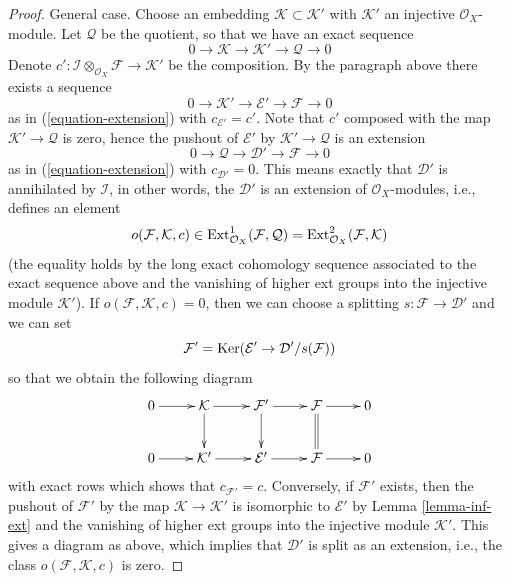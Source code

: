 \begin{proof}
\medskip\noindent
General case. Choose an embedding $\mathcal{K} \subset \mathcal{K}'$
with $\mathcal{K}'$ an injective $\mathcal{O}_X$-module. Let $\mathcal{Q}$
be the quotient, so that we have an exact sequence
$$
0 \to \mathcal{K} \to \mathcal{K}' \to \mathcal{Q} \to 0
$$
Denote
$c' : \mathcal{I} \otimes_{\mathcal{O}_X} \mathcal{F} \to \mathcal{K}'$
be the composition. By the paragraph above there exists a sequence
$$
0 \to \mathcal{K}' \to \mathcal{E}' \to \mathcal{F} \to 0
$$
as in (\ref{equation-extension}) with $c_{\mathcal{E}'} = c'$.
Note that $c'$ composed with the map $\mathcal{K}' \to \mathcal{Q}$
is zero, hence the pushout of $\mathcal{E}'$ by
$\mathcal{K}' \to \mathcal{Q}$ is an extension
$$
0 \to \mathcal{Q} \to \mathcal{D}' \to \mathcal{F} \to 0
$$
as in (\ref{equation-extension}) with $c_{\mathcal{D}'} = 0$.
This means exactly that $\mathcal{D}'$ is annihilated by
$\mathcal{I}$, in other words, the $\mathcal{D}'$ is an extension
of $\mathcal{O}_X$-modules, i.e., defines an element
$$
o(\mathcal{F}, \mathcal{K}, c) \in
\mathop{\mathrm{Ext}}\nolimits^1_{\mathcal{O}_X}(\mathcal{F}, \mathcal{Q}) =
\mathop{\mathrm{Ext}}\nolimits^2_{\mathcal{O}_X}(\mathcal{F}, \mathcal{K})
$$
(the equality holds by the long exact cohomology sequence associated
to the exact sequence above and the vanishing of higher ext groups
into the injective module $\mathcal{K}'$). If
$o(\mathcal{F}, \mathcal{K}, c) = 0$, then we can choose a splitting
$s : \mathcal{F} \to \mathcal{D}'$ and we can set
$$
\mathcal{F}' = \mathop{\mathrm{Ker}}(\mathcal{E}' \to \mathcal{D}'/s(\mathcal{F}))
$$
so that we obtain the following diagram
$$
\xymatrix{
0 \ar[r] &
\mathcal{K} \ar[r] \ar[d] &
\mathcal{F}' \ar[r] \ar[d] &
\mathcal{F} \ar[r] \ar@{=}[d] &
0 \\
0 \ar[r] &
\mathcal{K}' \ar[r] &
\mathcal{E}' \ar[r] &
\mathcal{F} \ar[r] & 0
}
$$
with exact rows which shows that $c_{\mathcal{F}'} = c$. Conversely, if
$\mathcal{F}'$ exists, then the pushout of $\mathcal{F}'$ by the map
$\mathcal{K} \to \mathcal{K}'$ is isomorphic to $\mathcal{E}'$ by
Lemma \ref{lemma-inf-ext} and the vanishing of higher ext groups
into the injective module $\mathcal{K}'$. This gives a diagram
as above, which implies that $\mathcal{D}'$ is split as an extension, i.e.,
the class $o(\mathcal{F}, \mathcal{K}, c)$ is zero.
\end{proof}

